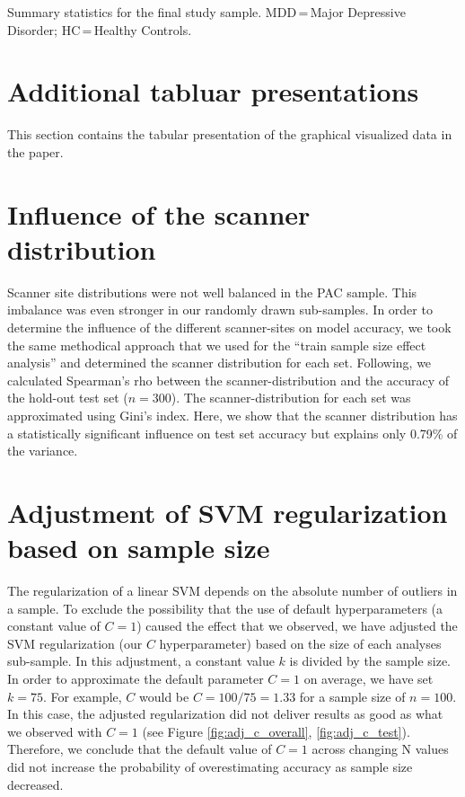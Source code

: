 \begin{table}[!htp]
\begin{center}
            \caption[Summary statistics for the final study sample.]{Summary statistics for the final study sample. MDD\,=\,Major Depressive Disorder; HC\,=\,Healthy Controls.}

        \end{center}
    \end{table}

    \FloatBarrier

    \section{Additional tabluar presentations}
    \setcounter{figure}{0}
	\setcounter{table}{0}
    This section contains the tabular presentation of the graphical visualized data in the paper.

    
    \FloatBarrier

    \section{Influence of the scanner distribution}
    \label{cha:influence_of_scanner_distribution}
    \setcounter{figure}{0}
	\setcounter{table}{0}
    Scanner site distributions were not well balanced in the PAC sample.
    This imbalance was even stronger in our randomly drawn sub-samples. In order to determine the influence of the different scanner-sites on model accuracy, we took the same methodical approach that we used for the “train sample size effect analysis” and determined the scanner distribution for each set. Following, we calculated Spearman’s rho between the scanner-distribution and the accuracy of the hold-out test set ($n=300$). The scanner-distribution for each set was approximated using Gini’s index. Here, we show that the scanner distribution has a statistically significant influence on test set accuracy but explains only 0.79\% of the variance.


    \FloatBarrier

    \section{Adjustment of SVM regularization based on sample size}
    \label{cha:adjusted_regularization_svm}
    \setcounter{figure}{0}
\setcounter{table}{0}
    The regularization of a linear SVM depends on the absolute number of outliers in a sample. To exclude the possibility that the use of default hyperparameters (a constant value of $C = 1$) caused the effect that we observed, we have adjusted the SVM regularization (our $C$ hyperparameter) based on the size of each analyses sub-sample. In this adjustment, a constant value $k$ is divided by the sample size. In order to approximate the default parameter $C=1$ on average, we have set $k=75$. For example, $C$ would be $C = 100/75 = \num{1.33}$ for a sample size of $n=100$. In this case, the adjusted regularization did not deliver results as good as what we observed with $C=1$ (see Figure \ref{fig:adj_c_overall}, \ref{fig:adj_c_test}). Therefore, we conclude that the default value of $C=1$ across changing N values did not increase the probability of overestimating accuracy as sample size decreased.

